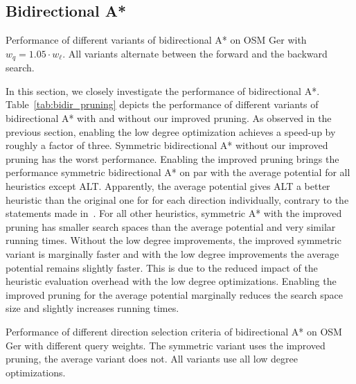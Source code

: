 \documentclass[manuscript,review]{acmart}
\begin{document}
\subsection{Bidirectional A*}

\begin{table}
\centering
\caption{
Performance of different variants of bidirectional A* on OSM Ger with $w_q = 1.05 \cdot w_\ell$.
All variants alternate between the forward and the backward search.}
\label{tab:bidir_pruning}

\end{table}

In this section, we closely investigate the performance of bidirectional A*.
Table~\ref{tab:bidir_pruning} depicts the performance of different variants of bidirectional A* with and without our improved pruning.
As observed in the previous section, enabling the low degree optimization achieves a speed-up by roughly a factor of three.
Symmetric bidirectional A* without our improved pruning has the worst performance.
Enabling the improved pruning brings the performance symmetric bidirectional A* on par with the average potential for all heuristics except ALT.
Apparently, the average potential gives ALT a better heuristic than the original one for for each direction individually, contrary to the statements made in~\cite{gh-cspas-05}.
For all other heuristics, symmetric A* with the improved pruning has smaller search spaces than the average potential and very similar running times.
Without the low degree improvements, the improved symmetric variant is marginally faster and with the low degree improvements the average potential remains slightly faster.
This is due to the reduced impact of the heuristic evaluation overhead with the low degree optimizations.
Enabling the improved pruning for the average potential marginally reduces the search space size and slightly increases running times.


\begin{table}
\centering
\caption{
Performance of different direction selection criteria of bidirectional A* on OSM Ger with different query weights.
The symmetric variant uses the improved pruning, the average variant does not.
All variants use all low degree optimizations.
}\label{tab:bidir_switching}

\end{table}
\end{document}

